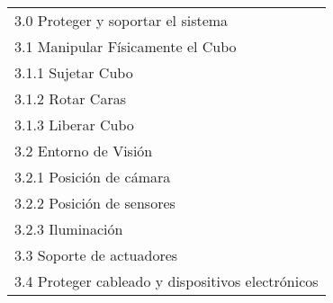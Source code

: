 \begin{table}[H]
\begin{tabular}{l}
3.0 \; Proteger y soportar el sistema \\
\hspace{0.5cm} 3.1 \; Manipular Físicamente el Cubo \\
\hspace{1cm} 3.1.1 \; Sujetar Cubo \\
\hspace{1cm} 3.1.2 \; Rotar Caras \\
\hspace{1cm} 3.1.3 \; Liberar Cubo \\
\hspace{0.5cm} 3.2 \; Entorno de Visión \\
\hspace{1cm} 3.2.1 \; Posición de cámara \\
\hspace{1cm} 3.2.2 \; Posición de sensores \\
\hspace{1cm} 3.2.3 \; Iluminación \\
\hspace{0.5cm} 3.3 \; Soporte de actuadores \\
\hspace{0.5cm} 3.4 \; Proteger cableado y dispositivos electrónicos \\\hline
\end{tabular}%
\end{table}
\renewcommand{\arraystretch}{1.0} %